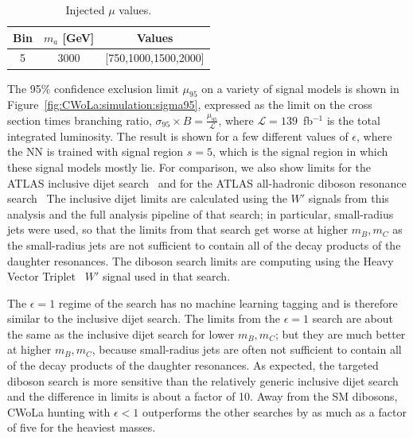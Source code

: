\begin{table}[htb]
  \centering
  \caption{Injected $\mu$ values.}
  \label{tab:MC:injectedmu}
  \begin{tabular}{c c c}
    \hline
    Bin & $m_a$ [GeV] & Values \\ \hline
    5 & 3000 & [750,1000,1500,2000] \\
    \hline
  \end{tabular}
\end{table} 



The 95\% confidence exclusion limit $\mu_{95}$ on a variety of signal models is shown in Figure~\ref{fig:CWoLa:simulation:sigma95}, expressed as the limit on the cross section times branching ratio, $\sigma_{95}\times B = \frac{\mu_{95}}{\mathcal{L}}$, where $\mathcal{L} = 139$~fb$^{-1}$ is the total integrated luminosity.
The result is shown for a few different values of $\epsilon$, where the NN is trained with signal region $s=5$, which is the signal region in which these signal models mostly lie.
For comparison, we also show limits for the ATLAS inclusive dijet search~\cite{Aad:2019hjw} and for the ATLAS all-hadronic diboson resonance search~\cite{Aad:2019fbh}
The inclusive dijet limits are calculated using the $W'$ signals from this analysis and the full analysis pipeline of that search;
in particular, small-radius jets were used, so that the limits from that search get worse at higher $m_B,m_C$ as the small-radius jets are not sufficient to contain all of the decay products of the daughter resonances.
The diboson search limits are computing using the Heavy Vector Triplet~\cite{Pappadopulo:2014qza} $W'$ signal used in that search.

The $\epsilon=1$ regime of the search has no machine learning tagging and is therefore similar to the inclusive dijet search.
The limits from the $\epsilon=1$ search are about the same as the inclusive dijet search for lower $m_B,m_C$; but they are much better at higher $m_B,m_C$, because small-radius jets are often not sufficient to contain all of the decay products of the daughter resonances.
As expected, the targeted diboson search is more sensitive than the relatively generic inclusive dijet search and the difference in limits is about a factor of 10.
Away from the SM dibosons, CWoLa hunting with $\epsilon<1$ outperforms the other searches by as much as a factor of five for the heaviest masses.

